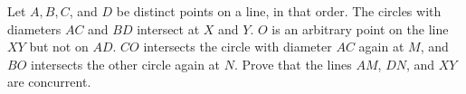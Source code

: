 Let $A, B, C$, and $D$ be distinct points on a line, in that order. The circles with diameters $AC$ and $BD$ intersect at $X$ and $Y$. $O$ is an arbitrary point on the line $XY$ but not on $AD$. $CO$ intersects the circle with diameter $AC$ again at $M$, and $BO$ intersects the other circle again at $N$. Prove that the lines $AM$, $DN$, and $XY$ are concurrent.
